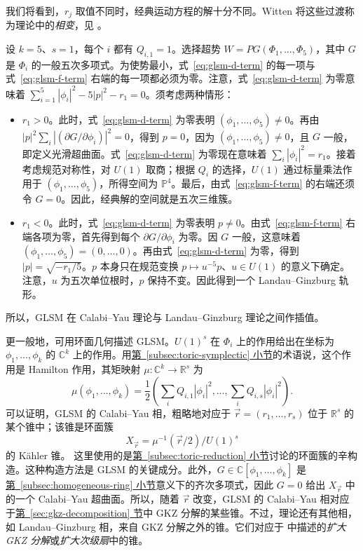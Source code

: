 我们将看到，$r_j$ 取值不同时，经典运动方程的解十分不同。Witten 将这些过渡称为理论中的\emph{相变}，见 。
\begin{example}\label{ex:glsm-quintic-phases}
设 $k=5$、$s=1$，每个 $i$ 都有 $Q_{i,1}=1$。选择超势 $W=PG(\Phi_1,\ldots,\Phi_5)$，其中 $G$ 是 $\Phi_i$ 的一般五次多项式。为使势最小，式~\eqref{eq:glsm-d-term} 的每一项与式~\eqref{eq:glsm-f-term} 右端的每一项都必须为零。注意，式~\eqref{eq:glsm-d-term} 为零意味着 $\sum_{i=1}^5|\phi_i|^2-5|p|^2-r_1=0$。须考虑两种情形：
\begin{itemize}
\item $r_1>0$。此时，式~\eqref{eq:glsm-d-term} 为零表明 $(\phi_1,\ldots,\phi_5)\ne0$。再由 $|p|^2\sum_i|(\partial G/\partial\phi_i)|^2=0$，得到 $p=0$，因为 $(\phi_1,\ldots,\phi_5)\ne0$，且 $G$ 一般，即定义光滑超曲面。式~\eqref{eq:glsm-d-term} 为零现在意味着 $\sum_i|\phi_i|^2=r_1$。接着考虑规范对称性，对 $U(1)$ 取商；根据 $Q_i$ 的选择，$U(1)$ 通过标量乘法作用于 $(\phi_1,\ldots,\phi_5)$，所得空间为 $\mathbb P^4$。最后，由式~\eqref{eq:glsm-f-term} 的右端还须令 $G=0$。因此，经典解的空间就是五次三维簇。
\item $r_1<0$。此时，式~\eqref{eq:glsm-d-term} 为零表明 $p\ne0$。由式~\eqref{eq:glsm-f-term} 右端各项为零，首先得到每个 $\partial G/\partial\phi_i$ 为零。因 $G$ 一般，这意味着 $(\phi_1,\ldots,\phi_5)=(0,\ldots,0)$。再由式~\eqref{eq:glsm-d-term} 为零，得到 $|p|=\sqrt{-r_1/5}$。$p$ 本身只在规范变换 $p\mapsto u^{-5}p$、$u\in U(1)$ 的意义下确定。注意，$u$ 为五次单位根时，$p$ 保持不变。因此得到一个 Landau--Ginzburg 轨形。
\end{itemize}
所以，GLSM 在 Calabi--Yau 理论与 Landau--Ginzburg 理论之间作插值。
\end{example}

更一般地，可用环面几何描述 GLSM。$U(1)^s$ 在 $\Phi_i$ 上的作用给出在坐标为 $\phi_1,\ldots,\phi_k$ 的 $\mathbb C^k$ 上的作用。用\hyperref[subsec:toric-symplectic]{第~\ref*{subsec:toric-symplectic} 小节}的术语说，这个作用是 Hamilton 作用，其矩映射 $\mu:\mathbb C^k\to\mathbb R^s$ 为
\[
\mu(\phi_1,\ldots,\phi_k)
=\frac12\left(\sum_iQ_{i,1}|\phi_i|^2,\ldots,\sum_iQ_{i,s}|\phi_i|^2\right).
\]
可以证明，GLSM 的 Calabi--Yau 相，粗略地对应于 $\vec r=(r_1,\ldots,r_s)$ 位于 $\mathbb R^s$ 的某个锥中；该锥是环面簇
\[
X_{\vec r}=\mu^{-1}(\vec r/2)/U(1)^s
\]
的 Kähler 锥。
这里使用的是\hyperref[subsec:toric-reduction]{第~\ref*{subsec:toric-reduction} 小节}讨论的环面簇的辛构造。这种构造方法是 GLSM 的关键成分。此外，$G\in\mathbb C[\phi_1,\ldots,\phi_k]$ 是\hyperref[subsec:homogeneous-ring]{第~\ref*{subsec:homogeneous-ring} 小节}意义下的齐次多项式，因此 $G=0$ 给出 $X_{\vec r}$ 中的一个 Calabi--Yau 超曲面。所以，随着 $\vec r$ 改变，GLSM 的 Calabi--Yau 相对应于\hyperref[sec:gkz-decomposition]{第~\ref*{sec:gkz-decomposition} 节}中 GKZ 分解的某些锥。不过，理论还有其他相，如 Landau--Ginzburg 相，来自 GKZ 分解之外的锥。它们对应于  中描述的\emph{扩大 GKZ 分解}或\emph{扩大次级扇}中的锥。

